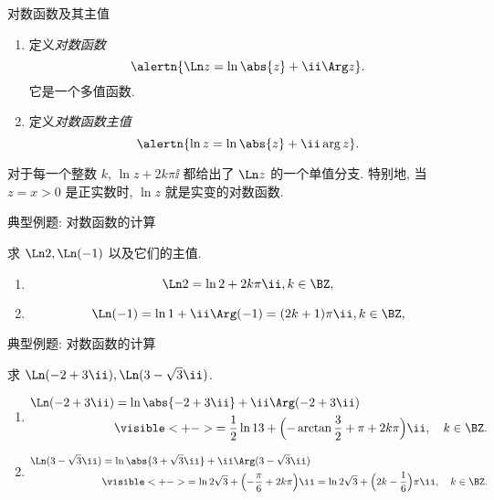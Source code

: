 \begin{frame}{对数函数及其主值}
	\onslide<+->
	\begin{definition}
		\begin{enumerate}
			\item 定义\emph{对数函数}
			\[
				\alertn{\Ln z=\ln\abs{z}+\ii\Arg z}.
			\]
			它是一个多值函数.
			\item 定义\emph{对数函数主值}
			\[
				\alertn{\ln z=\ln\abs{z}+\ii\arg z}.
			\]
			\bigdel
		\end{enumerate}
	\end{definition}

	\onslide<+->
	对于每一个整数 $k$, $\ln z+2k\pi\ii$ 都给出了 $\Ln z$ 的一个单值分支.
	\onslide<+->
	特别地, 当 $z=x>0$ 是正实数时, $\ln z$ 就是实变的对数函数.
\end{frame}


\begin{frame}{典型例题: 对数函数的计算}
	\onslide<+->
	\begin{example}[nearnext]
		求 $\Ln 2,\Ln(-1)$ 以及它们的主值.
	\end{example}
	\onslide<+->
	\begin{solution}[nearprev]
		\begin{enumerate}
			\item
			\[
				\Ln2=\ln2+2k\pi\ii, k\in\BZ,
			\]
			\onslide<+->{%
				主值为 $\ln 2$.
			}
			\item
			\[
				\Ln(-1)=\ln1+\ii\Arg(-1)=(2k+1)\pi\ii, k\in\BZ,
			\]
			\onslide<+->{%
				主值为 $\pi\ii$.
			}
		\end{enumerate}
	\end{solution}
\end{frame}


\begin{frame}{典型例题: 对数函数的计算}
	\beqskip{5pt}
	\onslide<+->
	\begin{example}[nearnext]
	求 $\Ln(-2+3\ii),\Ln(3-\sqrt3 \ii)$.
	\end{example}
	\onslide<+->
	\begin{solution}[nearprev]
		\begin{enumerate}
			\item
			\begin{align*}
				\Ln(-2+3\ii)&=\ln\abs{-2+3\ii}+\ii\Arg(-2+3\ii)\\
				&\visible<+->{=\frac 12\ln 13+\Bigl(-\arctan\frac 32+\pi+2k\pi\Bigr)\ii,\quad k\in\BZ.}
			\end{align*}
			\item
			\begin{align*}
				\Ln(3-\sqrt3\ii)&=\ln\abs{3+\sqrt 3\ii}+\ii\Arg(3-\sqrt 3\ii)\\
				&\visible<+->{=\ln 2\sqrt 3+\Bigl(-\frac\pi6+2k\pi\Bigr)\ii
				=\ln 2\sqrt 3+\Bigl(2k-\frac16\Bigr)\pi\ii,\quad k\in\BZ.}
			\end{align*}
		\end{enumerate}
		\bigdel
	\end{solution}
	\endgroup
\end{frame}


